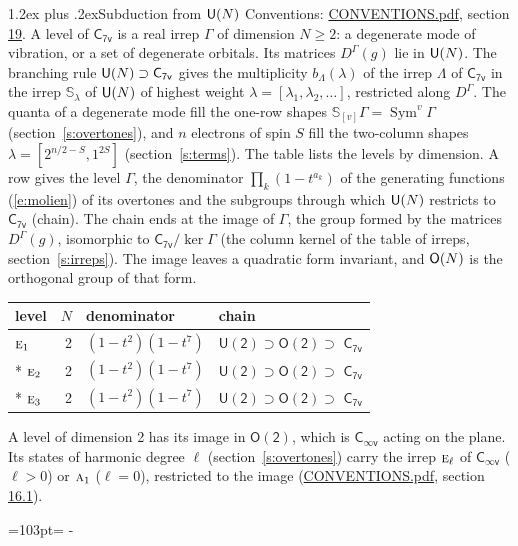 \documentclass[10pt,a4paper]{article}
\makeatletter
\renewcommand\section{\@startsection{section}{1}{\z@}{-3ex plus -1ex minus -.2ex}%
  {1.2ex plus .2ex}{\normalfont\large\sffamily\bfseries\color{parttitle}}}
\newcommand{\needspace}[1]{\par\penalty-100\begingroup\dimen0=#1\relax\dimen2=\pagegoal
  \advance\dimen2-\pagetotal\ifdim\dimen0>\dimen2\relax\ifdim\dimen2>0pt\vfil\break\fi\fi
  \endgroup}
\numberwithin{equation}{section}
\newcommand{\grp}[1]{\mathsf{#1}}
\newcommand{\irr}[1]{\text{\normalfont\scshape #1}}
\newcommand{\repD}[1]{D^{#1}}
\newcommand{\schur}[1]{\mathbb{S}_{#1}}
\newcommand{\shape}[1]{[#1]}
\makeatother
\begin{document}
\section{Subduction from \texorpdfstring{$\grp{U(\mathnormal{N})}$}{U(N)}}\label{s:unitary}
Conventions: \href{../../CONVENTIONS.pdf}{CONVENTIONS.pdf}, section \href{../../CONVENTIONS.pdf\#conv.19}{19}.
\leavevmode\label{n:local.level.dimension}A level of $\grp{C_{7v}}$ is a real irrep $\Gamma$ of dimension $N \ge 2$: a degenerate mode of vibration, or a set of degenerate orbitals. \label{n:group.unitary}Its matrices $\repD{\Gamma}(g)$ lie in $\grp{U(\mathnormal{N})}$. \label{n:irrep.schur}\label{n:shape.partition}\label{n:local.partition}\label{n:function.multiplicity.unitary}The branching rule $\grp{U(\mathnormal{N})} \supset \grp{C_{7v}}$ gives the multiplicity $b_\Lambda(\lambda)$ of the irrep $\Lambda$ of $\grp{C_{7v}}$ in the irrep $\schur{\lambda}$ of $\grp{U(\mathnormal{N})}$ of highest weight $\lambda = \shape{\lambda_1, \lambda_2, \dots}$, restricted along $\repD{\Gamma}$. \label{n:local.partition.power}\label{n:local.electrons}\label{n:local.spin}The quanta of a degenerate mode fill the one-row shapes $\schur{\shape{v}}\Gamma = \operatorname{Sym}^{v}\Gamma$ (section~\ref{s:overtones}), and $n$ electrons of spin $S$ fill the two-column shapes $\lambda = \shape{2^{n/2-S}, 1^{2S}}$ (section~\ref{s:terms}).
The table lists the levels by dimension. \label{n:head.level}\label{n:head.denominator}\label{n:index.overtone.denominator}\label{n:head.chain}A row gives the level $\Gamma$, the denominator $\prod_k (1 - t^{a_k})$ of the generating functions (\ref{e:molien}) of its overtones and the subgroups through which $\grp{U(\mathnormal{N})}$ restricts to $\grp{C_{7v}}$ (chain). The chain ends at the image of $\Gamma$, the group formed by the matrices $\repD{\Gamma}(g)$, isomorphic to $\grp{C_{7v}}/\ker\Gamma$ (the column kernel of the table of irreps, section~\ref{s:irreps}). The image leaves a quadratic form invariant, and $\grp{O(\mathnormal{N})}$ is the orthogonal group of that form.
{\small\begin{longtable}{@{}lrll@{}}\toprule
level & $N$ & denominator & chain\\\midrule\endhead
\bottomrule\endfoot\endlastfoot
$\irr{e}_{1}$ & 2 & $(1-t^{2})(1-t^{7})$ & $\grp{U(2)} \supset \grp{O(2)} \supset$ \href{C7v.pdf}{$\grp{C_{7v}}$}\\*
$\irr{e}_{2}$ & 2 & $(1-t^{2})(1-t^{7})$ & $\grp{U(2)} \supset \grp{O(2)} \supset$ \href{C7v.pdf}{$\grp{C_{7v}}$}\\*
$\irr{e}_{3}$ & 2 & $(1-t^{2})(1-t^{7})$ & $\grp{U(2)} \supset \grp{O(2)} \supset$ \href{C7v.pdf}{$\grp{C_{7v}}$}\\
\bottomrule\end{longtable}}
A level of dimension 2 has its image in $\grp{O(2)}$, which is \href{Cinfv.pdf}{$\grp{C_{\infty v}}$} acting on the plane. \label{n:index.harmonic.degree}Its states of harmonic degree $\ell$ (section~\ref{s:overtones}) carry the irrep $\irr{e}_{\ell}$ of \href{Cinfv.pdf}{$\grp{C_{\infty v}}$} ($\ell > 0$) or $\irr{a}_{1}$ ($\ell = 0$), restricted to the image (\href{../../CONVENTIONS.pdf}{CONVENTIONS.pdf}, section \href{../../CONVENTIONS.pdf\#conv.16.1}{16.1}).
\needspace{103pt}
\end{document}
